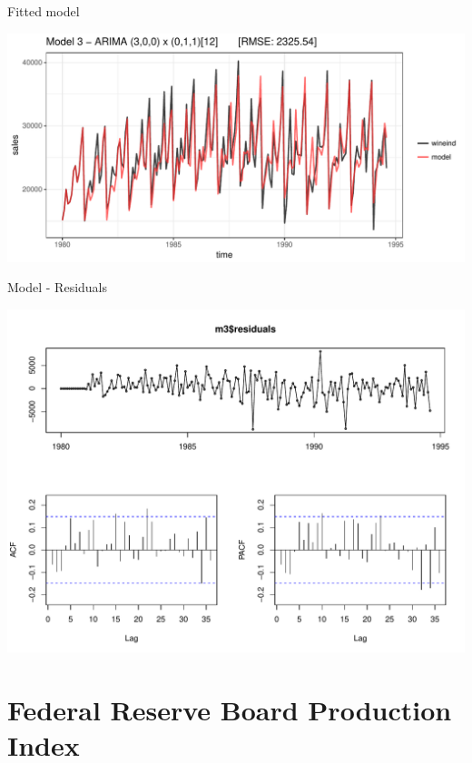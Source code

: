 \documentclass[11pt,ignorenonframetext,]{beamer}
\begin{document}
\begin{frame}{Fitted model}

\includegraphics{Lec11_files/figure-beamer/unnamed-chunk-10-1.pdf}

\end{frame}

\begin{frame}{Model - Residuals}

\includegraphics{Lec11_files/figure-beamer/unnamed-chunk-11-1.pdf}

\end{frame}

\section{Federal Reserve Board Production
Index}\label{federal-reserve-board-production-index}
\end{document}
